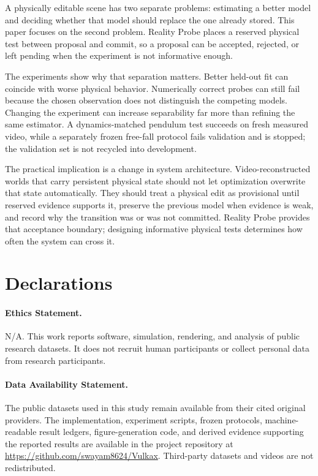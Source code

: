\documentclass[acmtog]{acmart}
\begin{document}
A physically editable scene has two separate problems: estimating a better model and deciding whether that model should replace the one already stored. This paper focuses on the second problem. Reality Probe places a reserved physical test between proposal and commit, so a proposal can be accepted, rejected, or left pending when the experiment is not informative enough.

The experiments show why that separation matters. Better held-out fit can coincide with worse physical behavior. Numerically correct probes can still fail because the chosen observation does not distinguish the competing models. Changing the experiment can increase separability far more than refining the same estimator. A dynamics-matched pendulum test succeeds on fresh measured video, while a separately frozen free-fall protocol fails validation and is stopped; the validation set is not recycled into development.

The practical implication is a change in system architecture. Video-reconstructed worlds that carry persistent physical state should not let optimization overwrite that state automatically. They should treat a physical edit as provisional until reserved evidence supports it, preserve the previous model when evidence is weak, and record why the transition was or was not committed. Reality Probe provides that acceptance boundary; designing informative physical tests determines how often the system can cross it.

\section*{Declarations}

\paragraph{Ethics Statement.}
N/A. This work reports software, simulation, rendering, and analysis of public research datasets. It does not recruit human participants or collect personal data from research participants.

\paragraph{Data Availability Statement.}
The public datasets used in this study remain available from their cited original providers. The implementation, experiment scripts, frozen protocols, machine-readable result ledgers, figure-generation code, and derived evidence supporting the reported results are available in the project repository at \url{https://github.com/swayam8624/Vulkax}. Third-party datasets and videos are not redistributed.
\end{document}
